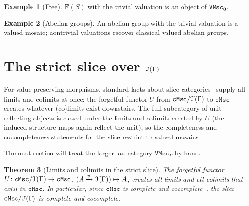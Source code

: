 \documentclass[11pt]{amsart}
\theoremstyle{plain}
\newtheorem{theorem}{Theorem}[section]
\theoremstyle{definition}
\newtheorem{example}[theorem]{Example}
\theoremstyle{remark}
\newcommand{\T}{\EuScript{T}}
\newcommand{\cMsc}{\mathtt{cMsc}}
\newcommand{\VMsc}{\mathtt{VMsc}}
\newcommand{\VMscG}{\mathtt{VMsc}_{\Gamma}}
\begin{document}
\begin{example}[Free]
\label{ex:free-val}
\(\mathbf{F}(S)\) with the trivial valuation is an object of \(\VMsc_{\mathbf{0}}\).
\end{example}

\begin{example}[Abelian groups]
An abelian group with the trivial valuation is a valued mosaic; nontrivial valuations recover classical valued abelian groups.
\end{example}


\section{The strict slice over \(\T(\Gamma)\)}
\label{sec:slice}

For value-preserving morphisms, standard facts about slice categories~\cite{Joh02,ML71} supply all limits and colimits at once: the forgetful functor \(U\) from \(\cMsc/\T(\Gamma)\) to \(\cMsc\) creates whatever (co)limits exist downstairs. The full subcategory of unit-reflecting objects is closed under the limits and colimits created by \(U\) (the induced structure maps again reflect the unit), so the completeness and cocompleteness statements for the slice restrict to valued mosaics.

The next section will treat the larger lax category \(\VMscG\) by hand.

\begin{theorem}[Limits and colimits in the strict slice]
\label{thm:strict-slice-limits}
The forgetful functor \(U\colon\cMsc/\T(\Gamma)\to\cMsc\), \((A\xrightarrow{v}\T(\Gamma))\mapsto A\), creates all limits and all colimits that exist in \(\cMsc\). In particular, since \(\cMsc\) is complete and cocomplete~\cite{NR23}, the slice \(\cMsc/\T(\Gamma)\) is complete and cocomplete.
\end{theorem}
\end{document}

